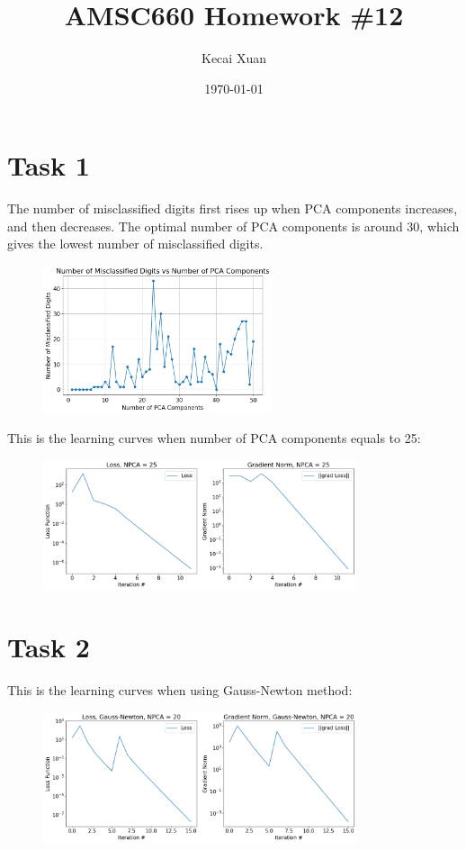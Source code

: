 \documentclass[12pt]{article}
\begin{document}
\setlength{\parindent}{0pt}

\title{AMSC660 Homework \#12}
\author{Kecai Xuan}
\date{\today}
\maketitle

\section*{Task 1}

The number of misclassified digits first rises up when PCA components increases, and then decreases. The optimal number of PCA components is around 30, which gives the lowest number of misclassified digits.

\begin{figure}[ht]
    \centering
    \includegraphics[width=0.6\textwidth]{./imgs/component.png}
\end{figure}

This is the learning curves when number of PCA components equals to 25:
\begin{figure}[ht]
    \centering
    \includegraphics[width=0.82\textwidth]{./imgs/loss.png}
\end{figure}


\section*{Task 2}

This is the learning curves when using Gauss-Newton method:
\begin{figure}[ht]
    \centering
    \includegraphics[width=0.82\textwidth]{./imgs/gauss_newton.png}
\end{figure}
\end{document}
